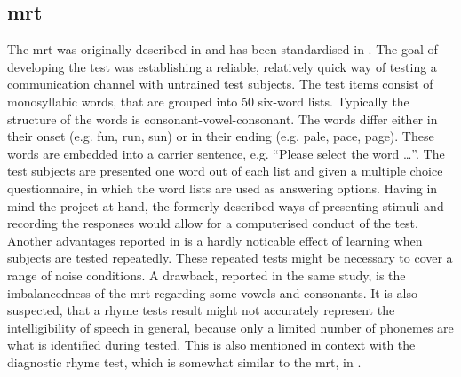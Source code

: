\subsection{\gls{mrt}}\label{ssec:mrt}
The \gls{mrt} was originally described in \citep{mrt_63} and has been standardised in \citep{ansi_s3.2}. The goal of developing the test was establishing a reliable, relatively quick way of testing a communication channel with untrained test subjects.
The test items consist of monosyllabic words, that are grouped into 50 six-word lists. Typically the structure of the words is consonant-vowel-consonant. The words differ either in their onset (e.g. fun, run, sun) or in their ending (e.g. pale, pace, page). 
These words are embedded into a carrier sentence, e.g. \enquote{Please select the word \dots}. 
The test subjects are presented one word out of each list and given a multiple choice questionnaire, in which the word lists are used as answering options. 
Having in mind the project at hand, the formerly described ways of presenting stimuli and recording the responses would allow for a computerised conduct of the test.
Another advantages reported in \citep[p. 17]{arl_us_army} is a hardly noticable effect of learning when subjects are tested repeatedly. These repeated tests might be necessary to cover a range of noise conditions.
A drawback, reported in the same study, is the imbalancedness of the \gls{mrt} regarding some vowels and consonants. 
It is also suspected, that a rhyme tests result might not accurately represent the intelligibility of speech in general, because only a limited number of phonemes are what is identified during tested. This is also mentioned in context with the diagnostic rhyme test, which is somewhat similar to the \gls{mrt}, in \citep{greenspan_98}. 

